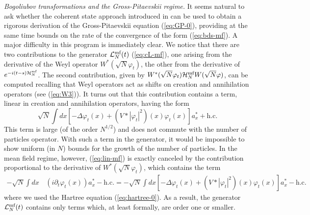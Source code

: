 \documentclass[11pt,a4paper]{article}
\newcommand{\cH}{{\cal H}}
\newcommand{\cL}{{\cal L}}
\begin{document}
{\it Bogoliubov transformations and the Gross-Pitaevskii regime.} It seems natural to ask whether the coherent state approach introduced in \cite{RS} can be used to obtain a rigorous derivation of the Gross-Pitaevskii equation (\ref{eq:GP-0}), providing at the same time bounds on the rate of the convergence of the form (\ref{eq:bds-mf}). A major difficulty in this program is immediately clear. 
We notice that there are two contributions to the generator $\cL^{\text{mf}}_N (t)$ (\ref{eq:cL-mf}), one 
 arising from the derivative of the Weyl operator $W^* (\sqrt{N}
 \varphi_t)$, the other from the derivative of $e^{-i (t-s) \cH^{\text{mf}}_N}$. The
 second contribution, given by $W^* (\sqrt{N} \varphi_t) \cH^{\text{mf}}_N
 W(\sqrt{N} \varphi)$, can be computed recalling that Weyl operators act as shifts on creation and annihilation operators (see (\ref{eq:W3})). It turns out that this contribution contains a term, linear in creation and annihilation operators, having the form
\begin{equation}\label{eq:lin-mf}  \sqrt{N} \int dx \left[ -\Delta \varphi_t (x) + (V*|\varphi_t|^2) (x) \varphi_t (x) \right] a_x^* + \text{h.c.} \end{equation}
This term is large (of the order $N^{1/2}$) and does not commute with the number of particles operator. With such a term in the generator, it would be impossible to show uniform (in $N$) bounds for the growth of the number of particles. In the mean field regime, however, (\ref{eq:lin-mf}) is exactly 
canceled by the contribution proportional to the derivative of $W^* (\sqrt{N} \varphi_t)$, which contains the term
\[ \begin{split} -\sqrt{N} \int dx \, & ( i \partial_t \varphi_t (x) ) a_x^* - \text{h.c.} = -
\sqrt{N} \int dx \left[ -\Delta \varphi_t (x) + (V*|\varphi_t|^2) (x) \varphi_t (x) \right] a_x^* - \text{h.c.} 
\end{split}
\]
where we used the Hartree equation (\ref{eq:hartree-0}). As a result, the generator $\cL_N^{\text{mf}} (t)$ contains only terms which, at least formally, are order one or smaller. 
\end{document}

